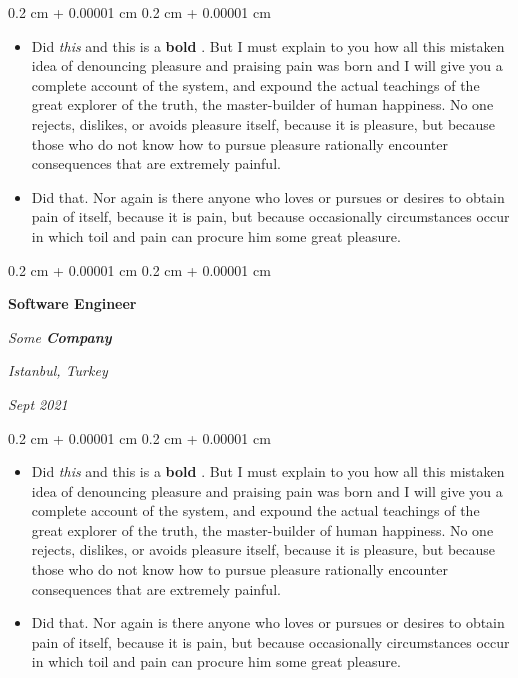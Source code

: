 \documentclass[10pt, letterpaper]{article}
\newenvironment{highlights}{
    \begin{itemize}[
        topsep=0.10 cm,
        parsep=0.10 cm,
        partopsep=0pt,
        itemsep=0pt,
        leftmargin=0.4 cm + 10pt
    ]
}{
    \end{itemize}
} %
\newenvironment{onecolentry}{
    \begin{adjustwidth}{
        0.2 cm + 0.00001 cm
    }{
        0.2 cm + 0.00001 cm
    }
}{
    \end{adjustwidth}
} %
\newenvironment{twocolentry}[2][]{
    \onecolentry
    \def\secondColumn{#2}
    \setcolumnwidth{\fill, 4.5 cm}
    \begin{paracol}{2}
}{
    \switchcolumn \raggedleft \secondColumn
    \end{paracol}
    \endonecolentry
} %
\let\hrefWithoutArrow\href
\renewcommand{\href}[2]{\hrefWithoutArrow{#1}{\ifthenelse{\equal{#2}{}}{ }{#2 }\raisebox{.15ex}{\footnotesize \faExternalLink*}}}
\begin{document}
        \vspace{0.10 cm}
        \begin{onecolentry}
            \begin{highlights}
                \item Did \textit{this} and this is a \textbf{bold} \href{https://example.com}{link}. But I must explain to you how all this mistaken idea of denouncing pleasure and praising pain was born and I will give you a complete account of the system, and expound the actual teachings of the great explorer of the truth, the master-builder of human happiness. No one rejects, dislikes, or avoids pleasure itself, because it is pleasure, but because those who do not know how to pursue pleasure rationally encounter consequences that are extremely painful.
                \item Did that. Nor again is there anyone who loves or pursues or desires to obtain pain of itself, because it is pain, but because occasionally circumstances occur in which toil and pain can procure him some great pleasure.
            \end{highlights}
        \end{onecolentry}


        \vspace{0.2 cm}

            \begin{twocolentry}{
        \textit{Istanbul, Turkey}

        \textit{Sept 2021}    }
                \textbf{Software Engineer}

                \textit{Some \textbf{Company}}
            \end{twocolentry}

        \vspace{0.10 cm}
        \begin{onecolentry}
            \begin{highlights}
                \item Did \textit{this} and this is a \textbf{bold} \href{https://example.com}{link}. But I must explain to you how all this mistaken idea of denouncing pleasure and praising pain was born and I will give you a complete account of the system, and expound the actual teachings of the great explorer of the truth, the master-builder of human happiness. No one rejects, dislikes, or avoids pleasure itself, because it is pleasure, but because those who do not know how to pursue pleasure rationally encounter consequences that are extremely painful.
                \item Did that. Nor again is there anyone who loves or pursues or desires to obtain pain of itself, because it is pain, but because occasionally circumstances occur in which toil and pain can procure him some great pleasure.
            \end{highlights}
        \end{onecolentry}
\end{document}

